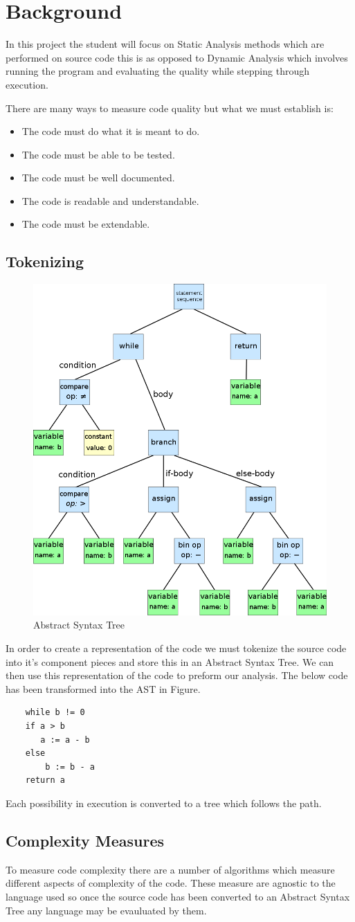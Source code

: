 \section{Background}
In this project the student will focus on Static Analysis methods which are performed on source code this is as opposed to Dynamic Analysis which involves running the program and evaluating the quality while stepping through execution.

There are many ways to measure code quality but what we must establish is:
\begin{itemize}
    \item The code must do what it is meant to do.
    \item The code must be able to be tested.
    \item The code must be well documented.
    \item The code is readable and understandable.
    \item The code must be extendable.
\end{itemize}
\subsection{Tokenizing}
\begin{figure}[h]
    \includegraphics[width=.2\textwidth]{images/abstract-syntax-tree.png}
    \caption{Abstract Syntax Tree}
    \label{fig:abs}
\end{figure}
In order to create a representation of the code we must tokenize the source code into it's component pieces and store this in an Abstract Syntax Tree. We can then use this representation of the code to preform our analysis.
The below code has been transformed into the AST in Figure.
\begin{verbatim}
    while b != 0
    if a > b
       a := a - b
    else
        b := b - a
    return a
\end{verbatim}
Each possibility in execution is converted to a tree which follows the path.
\subsection{Complexity Measures}
To measure code complexity there are a number of algorithms which measure different aspects of complexity of the code. These measure are agnostic to the language used so once the source code has been converted to an Abstract Syntax Tree any language may be evauluated by them.
